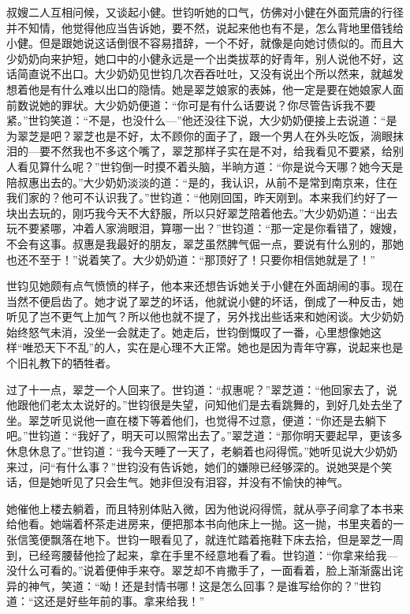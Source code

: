 \par 叔嫂二人互相问候，又谈起小健。世钧听她的口气，仿佛对小健在外面荒唐的行径并不知情，他觉得他应当告诉她，要不然，说起来他也有不是，怎么背地里借钱给小健。但是跟她说这话倒很不容易措辞，一个不好，就像是向她讨债似的。而且大少奶奶向来护短，她口中的小健永远是一个出类拔萃的好青年，别人说他不好，这话简直说不出口。大少奶奶见世钧几次吞吞吐吐，又没有说出个所以然来，就越发想着他是有什么难以出口的隐情。她是翠芝娘家的表姊，他一定是要在她娘家人面前数说她的罪状。大少奶奶便道：“你可是有什么话要说？你尽管告诉我不要紧。”世钧笑道：“不是，也没什么—”他还没往下说，大少奶奶便接上去说道：“是为翠芝是吧？翠芝也是不好，太不顾你的面子了，跟一个男人在外头吃饭，淌眼抹泪的—要不然我也不多这个嘴了，翠芝那样子实在是不对，给我看见不要紧，给别人看见算什么呢？”世钧倒一时摸不着头脑，半晌方道：“你是说今天哪？她今天是陪叔惠出去的。”大少奶奶淡淡的道：“是的，我认识，从前不是常到南京来，住在我们家的？他可不认识我了。”世钧道：“他刚回国，昨天刚到。本来我们约好了一块出去玩的，刚巧我今天不大舒服，所以只好翠芝陪着他去。”大少奶奶道：“出去玩不要紧哪，冲着人家淌眼泪，算哪一出？”世钧道：“那一定是你看错了，嫂嫂，不会有这事。叔惠是我最好的朋友，翠芝虽然脾气倔一点，要说有什么别的，那她也还不至于！”说着笑了。大少奶奶道：“那顶好了！只要你相信她就是了！”
\par 世钧见她颇有点气愤愤的样子，他本来还想告诉她关于小健在外面胡闹的事。现在当然不便启齿了。她才说了翠芝的坏话，他就说小健的坏话，倒成了一种反击，她听见了岂不更气上加气？所以他也就不提了，另外找出些话来和她闲谈。大少奶奶始终怒气未消，没坐一会就走了。她走后，世钧倒慨叹了一番，心里想像她这样“唯恐天下不乱”的人，实在是心理不大正常。她也是因为青年守寡，说起来也是个旧礼教下的牺牲者。
\par 过了十一点，翠芝一个人回来了。世钧道：“叔惠呢？”翠芝道：“他回家去了，说他跟他们老太太说好的。”世钧很是失望，问知他们是去看跳舞的，到好几处去坐了坐。翠芝听见说他一直在楼下等着他们，也觉得不过意，便道：“你还是去躺下吧。”世钧道：“我好了，明天可以照常出去了。”翠芝道：“那你明天要起早，更该多休息休息了。”世钧道：“我今天睡了一天了，老躺着也闷得慌。”她听见说大少奶奶来过，问“有什么事？”世钧没有告诉她，她们的嫌隙已经够深的。说她哭是个笑话，但是她听见了只会生气。她非但没有泪容，并没有不愉快的神气。
\par 她催他上楼去躺着，而且特别体贴入微，因为他说闷得慌，就从亭子间拿了本书来给他看。她端着杯茶走进房来，便把那本书向他床上一抛。这一抛，书里夹着的一张信笺便飘落在地下。世钧一眼看见了，就连忙踏着拖鞋下床去拾，但是翠芝一周到，已经弯腰替他捡了起来，拿在手里不经意地看了看。世钧道：“你拿来给我—没什么可看的。”说着便伸手来夺。翠芝却不肯撒手了，一面看着，脸上渐渐露出诧异的神气，笑道：“呦！还是封情书哪！这是怎么回事？是谁写给你的？”世钧道：“这还是好些年前的事。拿来给我！”
